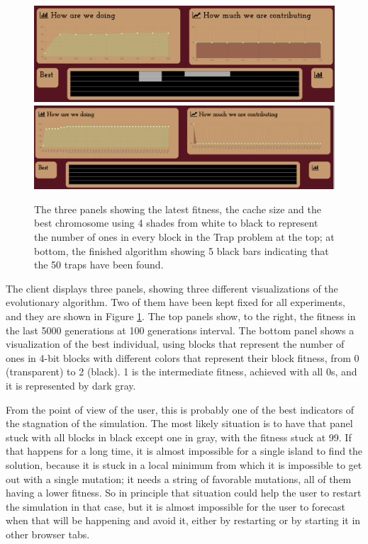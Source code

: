 \documentclass{sig-alternate}
\begin{document}
\begin{figure}[!htb]
\centering
\includegraphics[width=0.95\linewidth]{all.png}
\includegraphics[width=0.95\linewidth]{finish.png}
\caption{The three panels showing the latest fitness, the cache size
  and the best chromosome using 4 shades from white to black to
  represent the number of ones in every block in the Trap
  problem at the top; at bottom, the finished algorithm showing 5
  black bars indicating that the 50 traps have been found. \label{fig:all}}
\end{figure}
%
The client displays three panels, showing three different
visualizations of the evolutionary algorithm. Two of them have been
kept fixed for all experiments, and they are shown in Figure
\ref{fig:all}. The top panels show, to the right, the fitness in the
last 5000 generations at 100 generations interval. The bottom panel
shows a visualization of the best individual, using blocks that
represent the number of ones in 4-bit blocks with different colors
that represent their block fitness, from 0 (transparent) to 2
(black). 1 is the intermediate fitness, achieved with all 0s, and it
is represented by dark gray. 

From the point of view of the user, this is probably one of the best
indicators of the stagnation of the simulation. The most likely
situation is to have that panel stuck with all blocks in black except
one in gray, with the fitness stuck at 99. If that happens for a long
time, it is almost impossible for a single island to find the
solution, because it is stuck in a local minimum from which it is
impossible to get out with a single mutation; it needs a string of
favorable mutations, all of them having a lower fitness. So in
principle that situation could help the user to restart the simulation
in that case, but it is almost impossible for the user to forecast
when that will be happening and avoid it, either by restarting or by
starting it in other browser tabs. 
\end{document}
